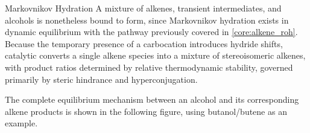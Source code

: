 \documentclass[10pt]{article}
\begin{document}
\begin{core}[label=core:mark_hydra]{Markovnikov Hydration}
        A mixture of alkenes, transient intermediates, and alcohols is nonetheless bound to form, since Markovnikov hydration exists in dynamic equilibrium with the pathway previously covered in \autoref{core:alkene_roh}. Because the temporary presence of a carbocation introduces hydride shifts, catalytic  converts a single alkene species into a mixture of stereoisomeric alkenes, with product ratios determined by relative thermodynamic stability, governed primarily by steric hindrance and hyperconjugation.


        The complete equilibrium mechanism between an alcohol and its corresponding alkene products is shown in the following figure, using butanol/butene as an example.


\end{core}
\end{document}
